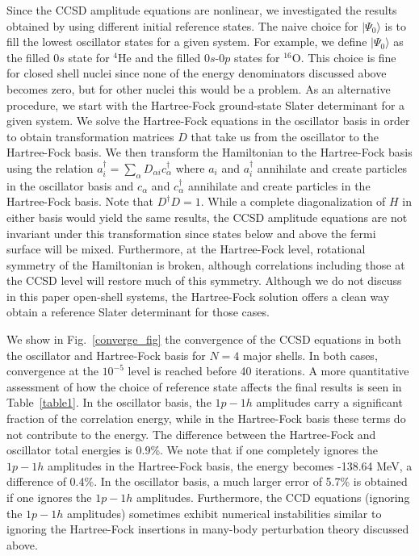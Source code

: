 Since the CCSD amplitude equations are nonlinear, we investigated
the results obtained by using different initial reference
states. The naive choice for $\mid\Psi_0\rangle$ is to fill the 
lowest oscillator states for a given system. For example, we define 
$\mid\Psi_0\rangle$ as the filled $0s$ state for $^{4}$He and the
filled $0s$-$0p$ states for $^{16}$O. This choice is fine for closed
shell nuclei since none of the energy denominators discussed above becomes
zero, but for other nuclei this would be a problem. As an alternative 
procedure, we start with the Hartree-Fock ground-state Slater determinant
for a given system. We solve the Hartree-Fock equations in the oscillator
basis in order to obtain transformation matrices $D$ that take us from the
oscillator to the Hartree-Fock basis. We then transform the Hamiltonian 
to the Hartree-Fock basis using the relation 
$a_i^\dagger = \sum_{\alpha}D_{\alpha i}c_\alpha^\dagger$ where $a_i$ and
$a_i^\dagger$ annihilate and create particles in the oscillator basis and
$c_\alpha$ and $c_\alpha^\dagger$ annihilate and create particles in the 
Hartree-Fock basis. Note that $D^\dagger D =1$. While a complete 
diagonalization of $H$ in either basis would yield the same results, 
the CCSD amplitude equations are not invariant under this 
transformation since states below and above the fermi surface will be 
mixed. Furthermore, at the Hartree-Fock level, rotational symmetry of 
the Hamiltonian is broken, although correlations including those
at the CCSD level
will restore much of this symmetry. Although we do not discuss in this 
paper open-shell systems, the Hartree-Fock solution offers a clean way
obtain a reference Slater determinant for those cases. 

We show in Fig.~\ref{converge_fig} the convergence of the 
CCSD equations in both the oscillator and Hartree-Fock basis for 
$N=4$ major shells. In both cases, convergence at the $10^{-5}$ level
is reached before 40 iterations. A more quantitative assessment 
of how the choice of reference state affects the final results
is seen in Table~\ref{table1}. In the oscillator basis, the $1p-1h$ amplitudes
carry a significant fraction of the correlation energy, while in the 
Hartree-Fock basis these terms do not contribute to the energy.  The difference
between the Hartree-Fock and oscillator total energies is 0.9\%. 
We note that if one
completely ignores the $1p-1h$ amplitudes in the Hartree-Fock basis, the
energy becomes -138.64 MeV, a difference of 0.4\%. In the
oscillator basis, a much larger error of 5.7\% is obtained if one ignores
the $1p-1h$ amplitudes. Furthermore, the CCD equations (ignoring the 
$1p-1h$ amplitudes) sometimes exhibit numerical instabilities similar to
ignoring the Hartree-Fock insertions 
in many-body perturbation theory discussed above. 

